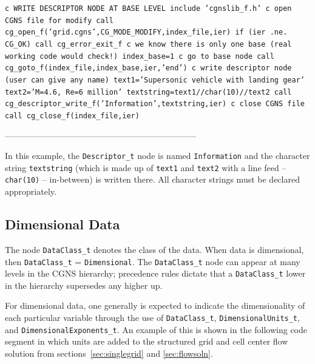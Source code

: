 \documentclass[12pt]{article}
\begin{document}
{\tt \noindent c  WRITE DESCRIPTOR NODE AT BASE LEVEL
\newline\indent      include 'cgnslib\_f.h'
\newline c  open CGNS file for modify
\newline\indent      call cg\_open\_f('grid.cgns',CG\_MODE\_MODIFY,index\_file,ier)
\newline\indent      if (ier .ne. CG\_OK) call cg\_error\_exit\_f
\newline c  we know there is only one base (real working code would check!)
\newline\indent      index\_base=1
\newline c   go to base node
\newline\indent      call cg\_goto\_f(index\_file,index\_base,ier,'end')
\newline c   write descriptor node (user can give any name)
\newline\indent      text1='Supersonic vehicle with landing gear'
\newline\indent      text2='M=4.6, Re=6 million'
\newline\indent      textstring=text1//char(10)//text2
\newline\indent      call cg\_descriptor\_write\_f('Information',textstring,ier)
\newline c  close CGNS file
\newline\indent      call cg\_close\_f(index\_file,ier)}

--------------------------------------------------------------------

\noindent In this example, the {\tt Descriptor\_t} node
is named {\tt Information} and
the character string {\tt textstring} (which is made up of {\tt text1}
and {\tt text2} with a line feed -- {\tt char(10)} -- in-between) is written there.
All character strings must be declared appropriately.

\subsection{Dimensional Data} \label{sec:dimens}

The node {\tt DataClass\_t} denotes the class of the data.  When
data is dimensional, then {\tt DataClass\_t} = {\tt Dimensional}.
The {\tt DataClass\_t} node can appear at many levels in the CGNS
hierarchy; precedence rules dictate that a {\tt DataClass\_t}
lower in the hierarchy supersedes any higher up.

For dimensional data, one generally is expected to indicate the
dimensionality of each particular variable through the use of
{\tt DataClass\_t}, {\tt DimensionalUnits\_t}, and
{\tt DimensionalExponents\_t}.  An example of this is
shown in the following code segment in which units are added
to the structured grid and cell center flow solution from 
sections~\ref{sec:singlegrid} and \ref{sec:flowsoln}.
\end{document}
